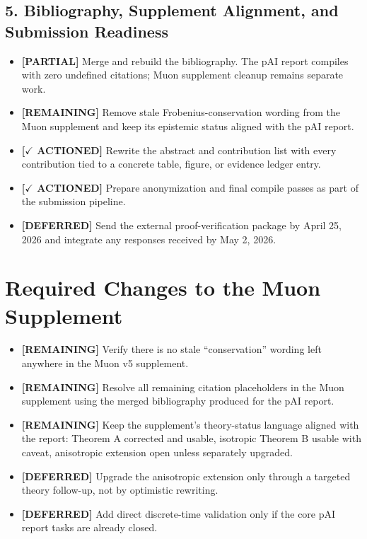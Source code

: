 \documentclass[11pt]{article}
\newcommand{\actioned}{\textbf{\textcolor{green!45!black}{[$\checkmark$ ACTIONED]}}}
\newcommand{\partialdone}{\textbf{\textcolor{orange!75!black}{[PARTIAL]}}}
\newcommand{\remaining}{\textbf{\textcolor{red!65!black}{[REMAINING]}}}
\newcommand{\deferred}{\textbf{\textcolor{blue!65!black}{[DEFERRED]}}}
\begin{document}
\subsection*{5. Bibliography, Supplement Alignment, and Submission Readiness}
\begin{itemize}
  \item \partialdone{} Merge and rebuild the bibliography. The pAI report compiles with zero undefined citations; Muon supplement cleanup remains separate work.
  \item \remaining{} Remove stale Frobenius-conservation wording from the Muon supplement and keep its epistemic status aligned with the pAI report.
  \item \actioned{} Rewrite the abstract and contribution list with every contribution tied to a concrete table, figure, or evidence ledger entry.
  \item \actioned{} Prepare anonymization and final compile passes as part of the submission pipeline.
  \item \deferred{} Send the external proof-verification package by April 25, 2026 and integrate any responses received by May 2, 2026.
\end{itemize}

\section*{Required Changes to the Muon Supplement}
\begin{itemize}
  \item \remaining{} Verify there is no stale ``conservation'' wording left anywhere in the Muon v5 supplement.
  \item \remaining{} Resolve all remaining citation placeholders in the Muon supplement using the merged bibliography produced for the pAI report.
  \item \remaining{} Keep the supplement's theory-status language aligned with the report: Theorem A corrected and usable, isotropic Theorem B usable with caveat, anisotropic extension open unless separately upgraded.
  \item \deferred{} Upgrade the anisotropic extension only through a targeted theory follow-up, not by optimistic rewriting.
  \item \deferred{} Add direct discrete-time validation only if the core pAI report tasks are already closed.
\end{itemize}
\end{document}
